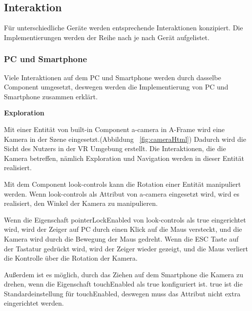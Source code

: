  \subsection{Interaktion}
  Für unterschiedliche Geräte werden entsprechende Interaktionen konzipiert. Die Implementierungen werden der Reihe nach je nach Gerät aufgelistet.
  
  \subsubsection{PC und Smartphone}
  Viele Interaktionen auf dem PC und Smartphone werden durch dasselbe Component umgesetzt, deswegen werden die Implementierung von PC und Smartphone zusammen erklärt.
  
  \vspace{1em}
  \noindent
  \textbf{Exploration}
  \vspace{1em}
  
  \noindent
  Mit einer Entität von built-in Component {\selectfont a-camera} in A-Frame wird eine Kamera in der Szene eingesetzt.(Abbildung ~\ref{fig:cameraHtml}) Dadurch wird die Sicht des Nutzers in der VR Umgebung erstellt. Die Interaktionen, die die Kamera betreffen, nämlich Exploration und Navigation werden in dieser Entität realisiert.
  
  Mit dem Component {\selectfont look-controls} kann die Rotation einer Entität manipuliert werden. Wenn {\selectfont look-controls} als Attribut von {\selectfont a-camera} eingesetzt wird, wird es realisiert, den Winkel der Kamera zu manipulieren.
  
  Wenn die Eigenschaft {\selectfont pointerLockEnabled} von {\selectfont look-controls}  als {\selectfont true} eingerichtet wird, wird der Zeiger auf PC durch einen Klick auf die Maus versteckt, und die Kamera wird durch die Bewegung der Maus gedreht. Wenn die ESC Taste auf der Tastatur gedrückt wird, wird der Zeiger wieder gezeigt, und die Maus verliert die Kontrolle über die Rotation der Kamera.
  
  Außerdem ist es möglich, durch das Ziehen auf dem Smartphone die Kamera zu drehen, wenn die Eigenschaft {\selectfont touchEnabled} als {\selectfont true} konfiguriert ist. {\selectfont true} ist die Standardeinstellung für {\selectfont touchEnabled}, deswegen muss das Attribut nicht extra eingerichtet werden.
  

